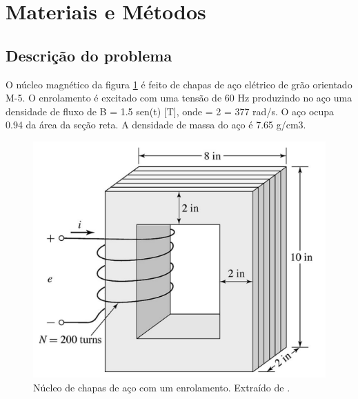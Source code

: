 
\section{Materiais e Métodos}

\subsection{Descrição do problema}
O núcleo magnético da figura \ref{circ} é feito de chapas de aço elétrico de grão orientado M-5. O enrolamento é excitado com uma tensão de 60 Hz produzindo no aço uma densidade de fluxo de B = 1.5 sen(\textomega t) [T], onde \textOmega = 2 = 377 rad/s. O aço ocupa 0.94 da área da seção reta. A densidade de massa do aço é 7.65 g/cm3. %
\begin{figure}[h]
\centering
\includegraphics[scale=0.6]{img/assig1/ex1_8.png}
\caption[Núcleo de chapas de aço com um enrolamento]{Núcleo de chapas de aço com um enrolamento. Extraído de \cite{Fitzgerald2008}.}
\label{circ}
\end{figure}

